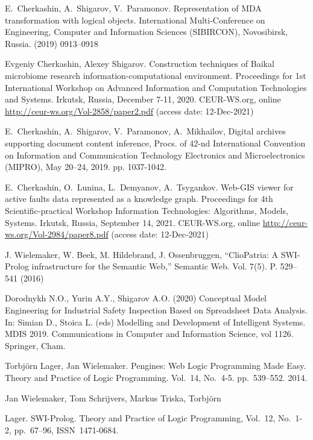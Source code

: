 \documentclass[
]{ceurart}
\begin{document}
\begin{thebibliography}{99}
 E.~Cherkashin, A.~Shigarov, V.~Paramonov. Representation of MDA transformation with logical objects.  International Multi-Conference on Engineering, Computer and Information Sciences (SIBIRCON), Novosibirsk, Russia. (2019) 0913--0918 

 Evgeniy Cherkashin, Alexey Shigarov. Construction techniques of Baikal microbiome research information-computational environment.  Proceedings for 1st International Workshop on Advanced Information and Computation Technologies and Systems. Irkutsk, Russia, December 7-11, 2020. CEUR-WS.org, online \url{http://ceur-ws.org/Vol-2858/paper2.pdf} (access date: 12-Dec-2021)

 E.~Cherkashin, A.~Shigarov, V.~Paramonov, A.~Mikhailov, Digital archives supporting document content inference, Procs.  of 42-nd International Convention on Information and Communication Technology Electronics and Microelectronics (MIPRO), May 20–24, 2019.  pp. 1037-1042. 

 E.~Cherkashin, O.~Lunina, L.~Demyanov, A.~Tsygankov. Web-GIS viewer for active faults data represented as a knowledge graph.  Proceedings for 4th Scientific-practical Workshop Information Technologies: Algorithms, Models, Systems. Irkutsk, Russia, September 14, 2021. CEUR-WS.org, online \url{http://ceur-ws.org/Vol-2984/paper8.pdf} (access date: 12-Dec-2021)

 J. Wielemaker, W. Beek, M. Hildebrand, J. Ossenbruggen, ``ClioPatria: A
  SWI-Prolog infrastructure for the Semantic Web,'' Semantic Web.
  Vol. 7(5).  P. 529--541 (2016) 

 Dorodnykh N.O., Yurin A.Y., Shigarov A.O. (2020) Conceptual Model Engineering for Industrial Safety Inspection Based on Spreadsheet Data Analysis.  In: Simian D., Stoica L. (eds) Modelling and Development of Intelligent Systems.  MDIS 2019.  Communications in Computer and Information Science, vol 1126.  Springer, Cham. 

 {Torbj{\"{o}}rn Lager, Jan Wielemaker. Pengines: Web Logic Programming Made Easy.  Theory and Practice of Logic Programming.  Vol.~14, No.~4-5. pp.~539--552. 2014. 

 Jan Wielemaker, Tom Schrijvers, Markus  Triska, Torbj\"o{}rn} Lager. SWI-Prolog. Theory and Practice of Logic Programming, Vol.~12, No.~1-2, pp.~67--96, ISSN~1471-0684.

\end{thebibliography}

\end{document}
